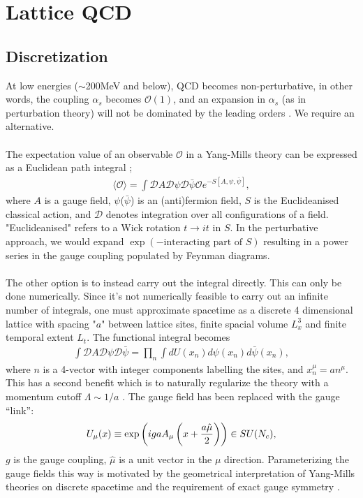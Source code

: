 
\section{Lattice QCD}
\label{sec:lat}

\subsection{Discretization}

At low energies ($\sim$200MeV and below), QCD becomes non-perturbative, in other words, the coupling $\alpha_s$ becomes $\mathcal{O}(1)$, and an expansion in $\alpha_s$ (as in perturbation theory) will not be dominated by the leading orders \cite{Schwartz:2013pla}. We require an alternative.
\\ \\
The expectation value of an observable $\mathcal{O}$ in a Yang-Mills theory can be expressed as a Euclidean path integral \cite{Lepage:1998dt};
\begin{align}
 \langle \mathcal{O} \rangle = \int \mathcal{D}A\mathcal{D}\psi\mathcal{D}\bar{\psi} \mathcal{O} e^{-S[A,\psi,\bar{\psi}]},
\end{align}
where $A$ is a gauge field, $\psi$($\bar{\psi}$) is an (anti)fermion field, $S$ is the Euclideanised classical action, and $\mathcal{D}$ denotes integration over all configurations of a field. "Euclideanised" refers to a Wick rotation $t\to it$ in $S$. In the perturbative approach, we would expand $\exp(-\text{interacting part of }S )$ resulting in a power series in
the gauge coupling populated by Feynman diagrams.
\\ \\
The other option is to instead carry out the integral directly. This can only be done numerically.
 Since it's not numerically feasible to carry out an infinite number of integrals, one must approximate spacetime as a discrete 4 dimensional lattice with spacing "$a$" between lattice sites, finite spacial volume $L_x^3$ and finite temporal extent $L_t$. The functional integral becomes
\begin{align}
 \int \mathcal{D}A\mathcal{D}\psi\mathcal{D}\bar{\psi} = \prod_{n} \int dU(x_n) d\psi(x_n) d\bar{\psi}(x_n),
\end{align}
where $n$ is a 4-vector with integer components labelling the sites, and $x_n^{\mu} = an^{\mu}$.
This has a second benefit which is to naturally regularize the theory with a momentum cutoff $\Lambda \sim 1/a$ \cite{Lepage:1998dt}. The gauge field has been replaced with the gauge
``link'':
\begin{align}
U_{\mu}(x) \equiv \exp\left(igaA_{\mu}\left(x+{a\hat{\mu}\over2}\right)\right) \in SU(N_c),
\end{align}
$g$ is the gauge coupling, $\hat{\mu}$ is a unit vector in the $\mu$ direction. Parameterizing the gauge fields this way is motivated by the geometrical interpretation of Yang-Mills theories on discrete spacetime and the requirement of exact gauge symmetry \cite{Munster:2000ez}.

